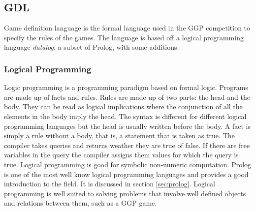 \subsection{GDL}\label{sec:GDL}
Game definition language is the formal language used in the GGP competition to specify the rules of the games\cite{GDL_Spec}. The language is based off a logical programming language \textit{datalog}, a subset of Prolog, with some additions.
\subsubsection{Logical Programming}
Logic programming is a programming paradigm based on formal logic. Programs are made up of facts and rules. Rules are made up of two parts: the head and the body. They can be read as logical implications where the conjunction of all the elements in the body imply the head. The syntax is different for different logical programming languages but the head is usually written before the body. A fact is simply a rule without a body, that is, a statement that is taken as true. The compiler takes queries and returns weather they are true of false. If there are free variables in the query the compiler assigns them values for which the query is true. Logical programming is good for symbolic non-numeric computation. Prolog is one of the most well know logical programming languages\cite{SWIPL} and provides a good introduction to the field. It is discussed in section \ref{sec:prolog}. Logical programming is well suited to solving problems that involve well defined objects and relations between them, such as a GGP game.
